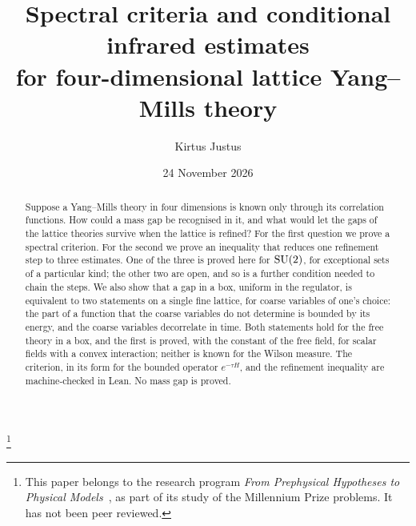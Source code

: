 
\usepackage{tikz}
\usetikzlibrary{positioning,arrows.meta}
\title[Spectral criteria and conditional infrared estimates]{Spectral criteria and conditional infrared estimates\\ for four-dimensional lattice Yang--Mills theory}
\author{Kirtus Justus}
\date{24 November 2026}
\thanks{This paper belongs to the research program \emph{From Prephysical Hypotheses to Physical
Models}~\cite{Prog}, as part of its study of the Millennium Prize problems. It has not been peer reviewed.}

\begin{abstract}
Suppose a Yang--Mills theory in four dimensions is known only through its correlation functions. How could a
mass gap be recognised in it, and what would let the gaps of the lattice theories survive when the lattice is
refined? For the first question we prove a spectral criterion. For the second we prove an inequality that
reduces one refinement step to three estimates. One of the three is proved here for $\mathrm{SU}(2)$, for
exceptional sets of a particular kind; the other two are open, and so is a further condition needed to chain
the steps. We also show that a gap in a box, uniform in the regulator, is equivalent to two statements on a
single fine lattice, for coarse variables of one's choice: the part of a function that the coarse variables
do not determine is bounded by its energy, and the coarse variables decorrelate in time. Both statements
hold for the free theory in a box, and the first is proved, with the constant of the free field, for scalar
fields with a convex interaction; neither is known for the Wilson measure. The criterion, in its form for the
bounded operator $e^{-\tau H}$, and the refinement inequality are machine-checked in Lean. No mass gap is
proved.
\end{abstract}
\maketitle
\setcounter{tocdepth}{1}
\tableofcontents

